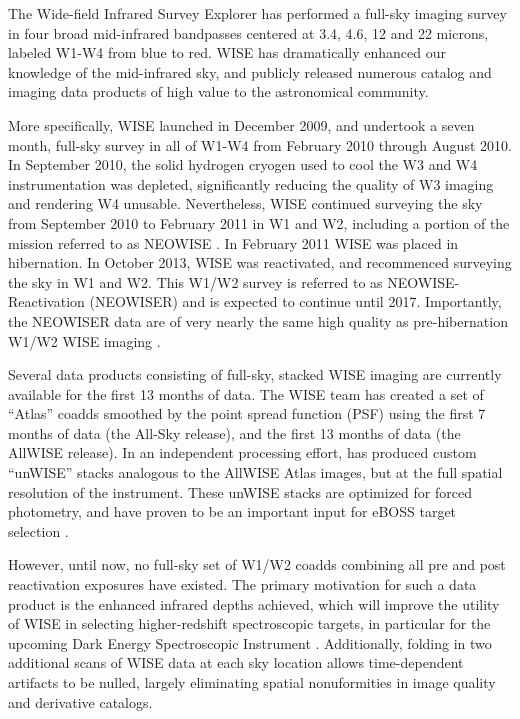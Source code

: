\documentclass{emulateapj}
\begin{document}
The Wide-field Infrared Survey Explorer \cite[WISE; ][]{wright10} has performed
a full-sky imaging survey in four broad mid-infrared bandpasses centered at 
3.4, 4.6, 12 and 22 microns, labeled W1-W4 from blue to red. WISE has 
dramatically enhanced our knowledge of the mid-infrared sky, and publicly 
released numerous catalog and imaging data products of high value to the 
astronomical community.

More specifically, WISE launched in December 2009, and undertook a seven 
month, full-sky survey in all of W1-W4 from February 2010 through August
2010. In September 2010, the solid hydrogen cryogen used to cool the W3 and W4 
instrumentation was depleted, significantly reducing the quality of W3 
imaging and rendering W4 unusable. Nevertheless, WISE continued surveying 
the sky from September 2010 to February 2011 in W1 and W2, including 
a portion of the mission referred to as NEOWISE \citep{neowise}. In February 
2011 WISE was placed in hibernation. In October 2013, WISE was reactivated, and
recommenced surveying the sky in W1 and W2. This W1/W2 survey is referred to as 
NEOWISE-Reactivation (NEOWISER) and is expected to continue until 2017.
Importantly, the NEOWISER data are of very nearly the same high quality as
pre-hibernation W1/W2 WISE imaging \citep{neowiser}.

Several data products consisting of full-sky, stacked WISE imaging are 
currently available for the first 13 months of data. The WISE team has created 
a set of ``Atlas'' coadds smoothed by the point spread function (PSF) using the
first 7 months of data (the All-Sky release), and the first 13 months of data 
(the AllWISE release). In an independent processing effort, \cite{lang14} has 
produced custom ``unWISE'' stacks analogous to the AllWISE Atlas images, but at
the full spatial resolution of the instrument. These unWISE stacks are 
optimized for forced photometry, and have proven to be an important input for 
eBOSS target selection \citep{lang14b, eboss_qso, eboss_lrg}.

However, until now, no full-sky set of W1/W2 coadds combining all pre and post 
reactivation exposures have existed. The primary motivation for such a data 
product is the enhanced infrared depths achieved, which will improve the 
utility of WISE in selecting higher-redshift spectroscopic targets, in 
particular for the upcoming Dark Energy Spectroscopic Instrument 
\citep[DESI,][]{desi}. Additionally, folding in two additional scans of WISE 
data at each sky location allows time-dependent artifacts to be nulled, largely
eliminating spatial nonuformities in image quality and derivative catalogs.
\end{document}
